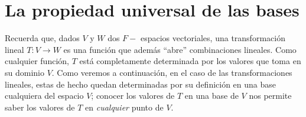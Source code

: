 \section{La propiedad universal de las bases}
Recuerda que, dados $V$ y $W$ dos $F-$ espacios vectoriales,
una transformación lineal $T:V \longrightarrow W$
es una función que además ``abre'' combinaciones lineales. Como cualquier
función, $T$ está completamente determinada por los valores que
toma en su dominio $V$. Como veremos a continuación, 
en el caso de las transformaciones lineales, estas de hecho quedan
determinadas por su definición en una base cualquiera
del espacio $V$; conocer los valores de $T$ en una base
de $V$ nos permite saber los valores de $T$ en \textit{cualquier}
punto de $V$.
